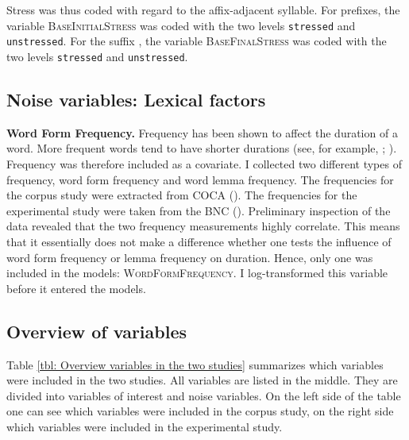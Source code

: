 Stress was thus coded with regard to the affix-adjacent syllable. For prefixes, the variable \textsc{BaseInitialStress} was coded with the two levels \texttt{stressed} and \texttt{unstressed}. For the suffix , the variable \textsc{BaseFinalStress} was coded with the two levels \texttt{stressed} and \texttt{unstressed}.



\subsection{Noise variables: Lexical factors}


\textbf{Word Form Frequency.}					
Frequency has been shown to affect the duration of a word. More frequent words tend to have shorter durations (see, for example, \citealt{Aylett.2004}; \citealt{Gahl.2008}). Frequency was therefore included as a covariate. I collected two different types of frequency, word form frequency and word lemma frequency. 
The frequencies for the corpus study were extracted from COCA (\citealt{Davies.20082014}). The frequencies for the experimental study were taken from the BNC (\citealt{Davies.2004}).
Preliminary inspection of the data revealed that the two frequency measurements highly correlate. This means that it essentially does not make a difference whether one tests the influence of word form frequency or lemma frequency on duration. Hence, only one was included in the models: \textsc{WordFormFrequency}. I log-transformed this variable before it entered the models.

\subsection{Overview of variables}
		
Table \ref{tbl: Overview variables in the two studies} summarizes which variables were included in the two studies. All variables are listed in the middle. They are divided into variables of interest and noise variables. On the left side of the table one can see which variables were included in the corpus study, on the right side which variables were included in the experimental study.  



